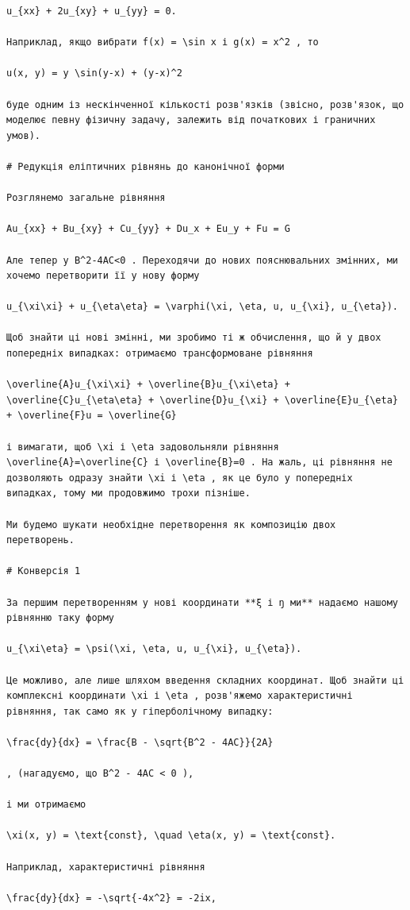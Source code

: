 \documentclass[
  ukrainian,
]{article}
\begin{document}
\begin{verbatim}
u_{xx} + 2u_{xy} + u_{yy} = 0.

Наприклад, якщо вибрати f(x) = \sin x і g(x) = x^2 , то

u(x, y) = y \sin(y-x) + (y-x)^2

буде одним із нескінченної кількості розв'язків (звісно, розв'язок, що моделює певну фізичну задачу, залежить від початкових і граничних умов).

# Редукція еліптичних рівнянь до канонічної форми

Розглянемо загальне рівняння

Au_{xx} + Bu_{xy} + Cu_{yy} + Du_x + Eu_y + Fu = G

Але тепер у B^2-4AC<0 . Переходячи до нових пояснювальних змінних, ми хочемо перетворити її у нову форму

u_{\xi\xi} + u_{\eta\eta} = \varphi(\xi, \eta, u, u_{\xi}, u_{\eta}).

Щоб знайти ці нові змінні, ми зробимо ті ж обчислення, що й у двох попередніх випадках: отримаємо трансформоване рівняння

\overline{A}u_{\xi\xi} + \overline{B}u_{\xi\eta} + \overline{C}u_{\eta\eta} + \overline{D}u_{\xi} + \overline{E}u_{\eta} + \overline{F}u = \overline{G}

і вимагати, щоб \xi і \eta задовольняли рівняння \overline{A}=\overline{C} і \overline{B}=0 . На жаль, ці рівняння не дозволяють одразу знайти \xi і \eta , як це було у попередніх випадках, тому ми продовжимо трохи пізніше.

Ми будемо шукати необхідне перетворення як композицію двох перетворень.

# Конверсія 1

За першим перетворенням у нові координати **ξ і ŋ ми** надаємо нашому рівнянню таку форму

u_{\xi\eta} = \psi(\xi, \eta, u, u_{\xi}, u_{\eta}).

Це можливо, але лише шляхом введення складних координат. Щоб знайти ці комплексні координати \xi і \eta , розв'яжемо характеристичні рівняння, так само як у гіперболічному випадку:

\frac{dy}{dx} = \frac{B - \sqrt{B^2 - 4AC}}{2A}

, (нагадуємо, що B^2 - 4AC < 0 ),

і ми отримаємо

\xi(x, y) = \text{const}, \quad \eta(x, y) = \text{const}.

Наприклад, характеристичні рівняння

\frac{dy}{dx} = -\sqrt{-4x^2} = -2ix,


\end{verbatim}
\end{document}
